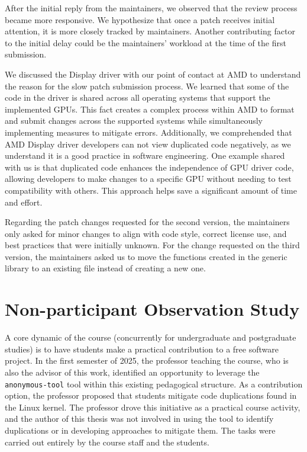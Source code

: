 \documentclass[12pt]{article}
\begin{document}
After the initial reply from the maintainers, we observed that the review process became more responsive. We hypothesize that once a patch receives initial attention, it is more closely tracked by maintainers. Another contributing factor to the initial delay could be the maintainers' workload at the time of the first submission.

We discussed the Display driver with our point of contact at AMD to understand the reason for the slow patch submission process. We learned that some of the code in the driver is shared across all operating systems that support the implemented GPUs. This fact creates a complex process within AMD to format and submit changes across the supported systems while simultaneously implementing measures to mitigate errors. Additionally, we comprehended that AMD Display driver developers can not view duplicated code negatively, as we understand it is a good practice in software engineering. One example shared with us is that duplicated code enhances the independence of GPU driver code, allowing developers to make changes to a specific GPU without needing to test compatibility with others. This approach helps save a significant amount of time and effort.

Regarding the patch changes requested for the second version, the maintainers only asked for minor changes to align with code style, correct license use, and best practices that were initially unknown. For the change requested on the third version, the maintainers asked us to move the functions created in the generic library to an existing file instead of creating a new one.

\section{Non-participant Observation Study}

A core dynamic of the course (concurrently for undergraduate and postgraduate studies) is to have students make a practical contribution to a free software project. In the first semester of 2025, the professor teaching the course, who is also the advisor of this work, identified an opportunity to leverage the \texttt{anonymous-tool} tool within this existing pedagogical structure. As a contribution option, the professor proposed that students mitigate code duplications found in the Linux kernel. The professor drove this initiative as a practical course activity, and the author of this thesis was not involved in using the tool to identify duplications or in developing approaches to mitigate them. The tasks were carried out entirely by the course staff and the students.
\end{document}
